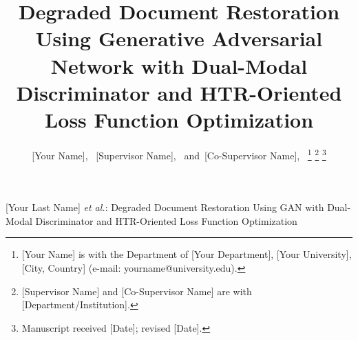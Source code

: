 \documentclass[journal]{IEEEtran}
\begin{document}
%
\title{Degraded Document Restoration Using Generative Adversarial Network with Dual-Modal Discriminator and HTR-Oriented Loss Function Optimization}
%
\author{[Your Name],~
        [Supervisor Name],~
        and~[Co-Supervisor Name],~%
\thanks{[Your Name] is with the Department of [Your Department], [Your University], [City, Country] (e-mail: yourname@university.edu).}%
\thanks{[Supervisor Name] and [Co-Supervisor Name] are with [Department/Institution].}%
\thanks{Manuscript received [Date]; revised [Date].}}

%
{[Your Last Name] \MakeLowercase{\textit{et al.}}: Degraded Document Restoration Using GAN with Dual-Modal Discriminator and HTR-Oriented Loss Function Optimization}

\maketitle
\end{document}
